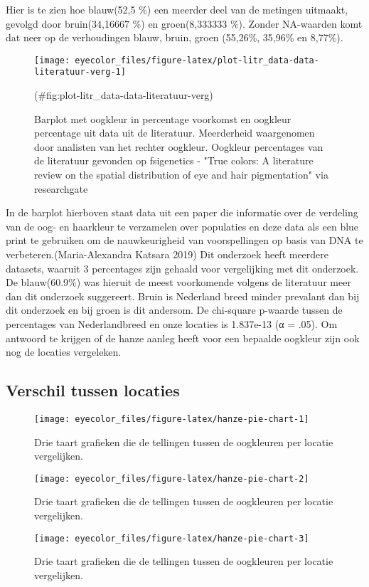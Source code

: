 \documentclass[
]{article}
\begin{document}
Hier is te zien hoe blauw(52,5 \%) een meerder deel van de metingen
uitmaakt, gevolgd door bruin(34,16667 \%) en groen(8,333333 \%). Zonder
NA-waarden komt dat neer op de verhoudingen blauw, bruin, groen (55,26\%,
35,96\% en 8,77\%).

\begin{figure}
\texttt{[image: eyecolor\_files/figure-latex/plot-litr\_data-data-literatuur-verg-1]} \caption{Barplot met oogkleur in percentage voorkomst en oogkleur percentage uit data uit de literatuur. Meerderheid waargenomen door analisten van het rechter oogkleur. Oogkleur percentages van de literatuur gevonden op fsigenetics - "True colors: A literature review on the spatial distribution of eye and hair pigmentation" via researchgate}(\#fig:plot-litr_data-data-literatuur-verg)
\end{figure}

In de barplot hierboven staat data uit een paper die informatie over de
verdeling van de oog- en haarkleur te verzamelen over populaties en deze
data als een blue print te gebruiken om de nauwkeurigheid van
voorspellingen op basis van DNA te verbeteren.(Maria-Alexandra Katsara 2019) Dit
onderzoek heeft meerdere datasets, waaruit 3 percentages zijn gehaald
voor vergelijking met dit onderzoek. De blauw(60.9\%) was hieruit de
meest voorkomende volgens de literatuur meer dan dit onderzoek
suggereert. Bruin is Nederland breed minder prevalant dan bij dit
onderzoek en bij groen is dit andersom. De chi-square p-waarde tussen de
percentages van Nederlandbreed en onze locaties is 1.837e-13 (α = .05).
Om antwoord te krijgen of de hanze aanleg heeft voor een bepaalde
oogkleur zijn ook nog de locaties vergeleken.

\hypertarget{verschil-tussen-locaties}{%
\subsection{Verschil tussen locaties}\label{verschil-tussen-locaties}}

\begin{figure}
\texttt{[image: eyecolor\_files/figure-latex/hanze-pie-chart-1]} \caption{Drie taart grafieken die de tellingen tussen de oogkleuren per locatie vergelijken.}\label{fig:hanze-pie-chart-1}
\end{figure}
\begin{figure}
\texttt{[image: eyecolor\_files/figure-latex/hanze-pie-chart-2]} \caption{Drie taart grafieken die de tellingen tussen de oogkleuren per locatie vergelijken.}\label{fig:hanze-pie-chart-2}
\end{figure}
\begin{figure}
\texttt{[image: eyecolor\_files/figure-latex/hanze-pie-chart-3]} \caption{Drie taart grafieken die de tellingen tussen de oogkleuren per locatie vergelijken.}\label{fig:hanze-pie-chart-3}
\end{figure}
\end{document}
